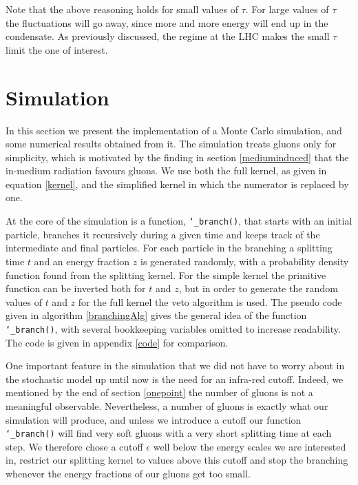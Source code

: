 \documentclass[a4paper,12pt]{article}
\numberwithin{equation}{section}
\begin{document}
Note that the above reasoning holds for small values of $\tau$. For large values of $\tau$ the fluctuations will go away, since more and more energy will end up in the condensate. As previously discussed, the regime at the LHC makes the small $\tau$ limit the one of interest.


\section{Simulation}\label{simulation}
In this section we present the implementation of a Monte Carlo simulation, and some numerical results obtained from it. The simulation treats gluons only for simplicity, which is motivated by the finding in section \ref{mediuminduced} that the in-medium radiation favours gluons. We use both the full kernel, as given in equation \eqref{kernel}, and the simplified kernel in which the numerator is replaced by one. 








At the core of the simulation is a function, {\tt \char`_branch()}, that starts with an initial particle, branches it recursively during a given time and keeps track of the intermediate and final particles. For each particle in the branching a splitting time $t$ and an energy fraction $z$ is generated randomly, with a probability density function found from the splitting kernel. For the simple kernel the primitive function can be inverted both for $t$ and $z$, but in order to generate the random values of $t$ and $z$ for the full kernel the veto algorithm is used.
The pseudo code given in algorithm \ref{branchingAlg} gives the general idea of the function {\tt \char`_branch()}, with several bookkeeping variables omitted to increase readability. The code is given in appendix \ref{code} for comparison.


One important feature in the simulation that we did not have to worry about in the stochastic model up until now is the need for an infra-red cutoff. Indeed, we mentioned by the end of section \ref{onepoint} the number of gluons is not a meaningful observable. Nevertheless, a number of gluons is exactly what our simulation will produce, and unless we introduce a cutoff our function {\tt \char`_branch()} will find very soft gluons with a very short splitting time at each step. We therefore chose a cutoff $\epsilon$ well below the energy scales we are interested in, restrict our splitting kernel to values above this cutoff and stop the branching whenever the energy fractions of our gluons get too small.
\end{document}
